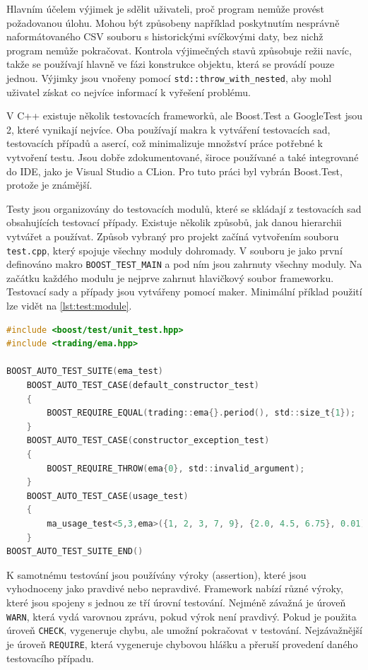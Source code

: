 Hlavním účelem výjimek je sdělit uživateli, proč program nemůže provést požadovanou úlohu.
Mohou být způsobeny například poskytnutím nesprávně naformátovaného CSV souboru s historickými svíčkovými daty, bez nichž program nemůže pokračovat.
Kontrola výjimečných stavů způsobuje režii navíc, takže se používají hlavně ve fázi konstrukce objektu, která se provádí pouze jednou.
Výjimky jsou vnořeny pomocí \texttt{std::throw\_with\_nested}, aby mohl uživatel získat co nejvíce informací k vyřešení problému.

V C++ existuje několik testovacích frameworků, ale Boost.Test a GoogleTest jsou 2, které vynikají nejvíce.
Oba používají makra k vytváření testovacích sad, testovacích případů a asercí, což minimalizuje množství práce potřebné k vytvoření testu.
Jsou dobře zdokumentované, široce používané a také integrované do IDE, jako je Visual Studio a CLion.
Pro tuto práci byl vybrán Boost.Test, protože je známější.

Testy jsou organizovány do testovacích modulů, které se skládají z testovacích sad obsahujících testovací případy.
Existuje několik způsobů, jak danou hierarchii vytvářet a používat.
Způsob vybraný pro projekt začíná vytvořením souboru \texttt{test.cpp}, který spojuje všechny moduly dohromady.
V souboru je jako první definováno makro \texttt{BOOST\_TEST\_MAIN} a pod ním jsou zahrnuty všechny moduly.
Na začátku každého modulu je nejprve zahrnut hlavičkový soubor frameworku.
Testovací sady a případy jsou vytvářeny pomocí maker.
Minimální příklad použití lze vidět na \ref{lst:test:module}.

\begin{lstlisting}[caption={~Ukázka testovacího modulu},label={lst:test:module},captionpos=t,abovecaptionskip=-\medskipamount,belowcaptionskip=\medskipamount,language=C]
#include <boost/test/unit_test.hpp>
#include <trading/ema.hpp>

BOOST_AUTO_TEST_SUITE(ema_test)
    BOOST_AUTO_TEST_CASE(default_constructor_test)
    {
        BOOST_REQUIRE_EQUAL(trading::ema{}.period(), std::size_t{1});
    }
    BOOST_AUTO_TEST_CASE(constructor_exception_test)
    {
        BOOST_REQUIRE_THROW(ema{0}, std::invalid_argument);
    }
    BOOST_AUTO_TEST_CASE(usage_test)
    {
        ma_usage_test<5,3,ema>({1, 2, 3, 7, 9}, {2.0, 4.5, 6.75}, 0.01);
    }
BOOST_AUTO_TEST_SUITE_END()
\end{lstlisting}

K samotnému testování jsou používány výroky (assertion), které jsou vyhodnoceny jako pravdivé nebo nepravdivé.
Framework nabízí různé výroky, které jsou spojeny s jednou ze tří úrovní testování.
Nejméně závažná je úroveň \texttt{WARN}, která vydá varovnou zprávu, pokud výrok není pravdivý.
Pokud je použita úroveň \texttt{CHECK}, vygeneruje chybu, ale umožní pokračovat v testování.
Nejzávažnější je úroveň \texttt{REQUIRE}, která vygeneruje chybovou hlášku a přeruší provedení daného testovacího případu.

